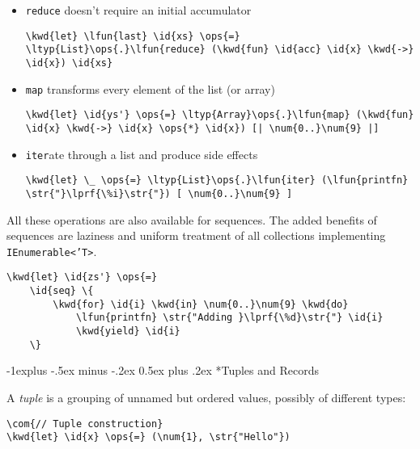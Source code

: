 \documentclass[10pt,landscape]{article}
\makeatletter
\renewcommand{\subsection}{\@startsection{subsection}{2}{0mm}%
                                {-1explus -.5ex minus -.2ex}%
                                {0.5ex plus .2ex}%
                                {\normalfont\normalsize\bfseries}}
\newcommand{\id}[1]{\textcolor[HTML]{000000}{#1}}
\newcommand{\str}[1]{\textcolor[HTML]{A31515}{#1}}
\newcommand{\kwd}[1]{\textcolor[HTML]{0000FF}{#1}}
\newcommand{\com}[1]{\textcolor[HTML]{008000}{#1}}
\newcommand{\ops}[1]{\textcolor[HTML]{000000}{#1}}
\newcommand{\num}[1]{\textcolor[HTML]{000000}{#1}}
\newcommand{\ltyp}[1]{\textcolor[HTML]{2B91AF}{#1}}
\newcommand{\lfun}[1]{\textcolor[HTML]{0000A0}{#1}}
\newcommand{\lprf}[1]{\textcolor[HTML]{2B91AF}{#1}}
\makeatother
\begin{document}
\begin{multicols}{3}
\begin{itemize}
\item 

\texttt{reduce} doesn't require an initial accumulator
\begin{Verbatim}[commandchars=\\\{\}]
\kwd{let} \lfun{last} \id{xs} \ops{=} \ltyp{List}\ops{.}\lfun{reduce} (\kwd{fun} \id{acc} \id{x} \kwd{->} \id{x}) \id{xs}
\end{Verbatim}


\item 

\texttt{map} transforms every element of the list (or array)
\begin{Verbatim}[commandchars=\\\{\}]
\kwd{let} \id{ys'} \ops{=} \ltyp{Array}\ops{.}\lfun{map} (\kwd{fun} \id{x} \kwd{->} \id{x} \ops{*} \id{x}) [| \num{0..}\num{9} |]
\end{Verbatim}


\item 

\texttt{iter}ate through a list and produce side effects
\begin{Verbatim}[commandchars=\\\{\}]
\kwd{let} \_ \ops{=} \ltyp{List}\ops{.}\lfun{iter} (\lfun{printfn} \str{"}\lprf{\%i}\str{"}) [ \num{0..}\num{9} ] 
\end{Verbatim}


\end{itemize}



All these operations are also available for sequences. The added benefits of sequences are laziness and uniform treatment of all collections implementing \texttt{IEnumerable<'T>}.
\begin{Verbatim}[commandchars=\\\{\}]
\kwd{let} \id{zs'} \ops{=}
    \id{seq} \{ 
        \kwd{for} \id{i} \kwd{in} \num{0..}\num{9} \kwd{do}
            \lfun{printfn} \str{"Adding }\lprf{\%d}\str{"} \id{i}
            \kwd{yield} \id{i}
    \}

\end{Verbatim}

\subsection*{Tuples and Records}



A \emph{tuple} is a grouping of unnamed but ordered values, possibly of different types:
\begin{Verbatim}[commandchars=\\\{\}]
\com{// Tuple construction}
\kwd{let} \id{x} \ops{=} (\num{1}, \str{"Hello"})


\end{Verbatim}
\end{multicols}
\end{document}
